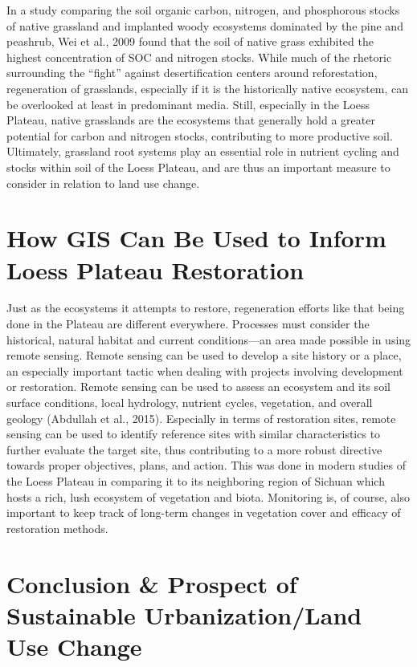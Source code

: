\documentclass{book}\usepackage{knitr}
\begin{document}
In a study comparing the soil organic carbon, nitrogen, and phosphorous stocks of native grassland and implanted woody ecosystems dominated by the pine and peashrub, Wei et al., 2009 found that the soil of native grass exhibited the highest concentration of SOC and nitrogen stocks. While much of the rhetoric surrounding the “fight” against desertification centers around reforestation, regeneration of grasslands, especially if it is the historically native ecosystem, can be overlooked at least in predominant media. Still, especially in the Loess Plateau, native grasslands are the ecosystems that generally hold a greater potential for carbon and nitrogen stocks, contributing to more productive soil. Ultimately, grassland root systems play an essential role in nutrient cycling and stocks within soil of the Loess Plateau, and are thus an important measure to consider in relation to land use change.

\section{How GIS Can Be Used to Inform Loess Plateau Restoration}

Just as the ecosystems it attempts to restore, regeneration efforts like that being done in the Plateau are different everywhere. Processes must consider the historical, natural habitat and current conditions—an area made possible in using remote sensing. Remote sensing can be used to develop a site history or a place, an especially important tactic when dealing with projects involving development or restoration. Remote sensing can be used to assess an ecosystem and its soil surface conditions, local hydrology, nutrient cycles, vegetation, and overall geology (Abdullah et al., 2015). Especially in terms of restoration sites, remote sensing can be used to identify reference sites with similar characteristics to further evaluate the target site, thus contributing to a more robust directive towards proper objectives, plans, and action. This was done in modern studies of the Loess Plateau in comparing it to its neighboring region of Sichuan which hosts a rich, lush ecosystem of vegetation and biota. Monitoring is, of course, also important to keep track of long-term changes in vegetation cover and efficacy of restoration methods.




\section{Conclusion \& Prospect of Sustainable Urbanization/Land Use Change}
\end{document}
